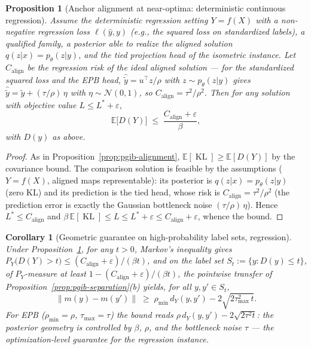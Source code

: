 \documentclass{article}
\theoremstyle{plain}
\newtheorem{proposition}{Proposition}[section]
\newtheorem{corollary}{Corollary}[section]
\theoremstyle{remark}
\newcommand{\E}{\mathbb{E}}
\DeclareMathOperator{\KL}{KL}
\begin{document}
\begin{proposition}[Anchor alignment at near-optima: deterministic continuous regression]
\label{prop:pgib-alignment-regression}
Assume the deterministic regression setting $Y = f(X)$ with a non-negative regression
loss $\ell(\hat y, y)$ (e.g., the squared loss on standardized labels), a qualified
family, a posterior able to realize the aligned solution $q(z|x) = p_\theta(z|y)$,
and the tied projection head of the isometric instance. Let $C_{\mathrm{align}}$ be
the regression risk of the ideal aligned solution --- for the standardized squared
loss and the EPB head, $\hat{\tilde y} = u^{\top} z/\rho$ with
$z \sim p_\theta(z|y)$ gives
$\hat{\tilde y} = \tilde y + (\tau/\rho)\,\eta$ with $\eta \sim \mathcal{N}(0,1)$,
so $C_{\mathrm{align}} = \tau^2/\rho^2$. Then for any solution with objective value
$L \le L^* + \varepsilon$,
\begin{equation}
\E\bigl[ D(Y) \bigr] \;\le\; \frac{C_{\mathrm{align}} + \varepsilon}{\beta} ,
\end{equation}
with $D(y)$ as above.
\end{proposition}

\begin{proof}
As in Proposition~\ref{prop:pgib-alignment},
$\E[\KL] \ge \E[D(Y)]$ by the covariance bound. The comparison solution is feasible
by the assumptions ($Y = f(X)$, aligned maps representable): its posterior is
$q(z|x) = p_\theta(z|y)$ (zero KL) and its prediction is the tied head, whose risk is
$C_{\mathrm{align}} = \tau^2/\rho^2$ (the prediction error is exactly the Gaussian
bottleneck noise $(\tau/\rho)\,\eta$). Hence $L^* \le C_{\mathrm{align}}$ and
$\beta\,\E[\KL] \le L \le L^* + \varepsilon \le C_{\mathrm{align}} + \varepsilon$,
whence the bound.
\end{proof}

\begin{corollary}[Geometric guarantee on high-probability label sets, regression]
\label{cor:pgib-alignment-regression}
Under Proposition~\ref{prop:pgib-alignment-regression}, for any $t > 0$, Markov's
inequality gives
$P_Y\bigl(D(Y) > t\bigr) \le (C_{\mathrm{align}} + \varepsilon)/(\beta t)$, and on the
label set $S_t := \{ y : D(y) \le t \}$, of $P_Y$-measure at least
$1 - (C_{\mathrm{align}} + \varepsilon)/(\beta t)$, the pointwise transfer of
Proposition~\ref{prop:pgib-separation}(b) yields, for all $y, y' \in S_t$,
\begin{equation}
\|m(y) - m(y')\| \;\ge\; \rho_{\min}\, d_Y(y, y')
- 2\sqrt{2\tau^2_{\max}\, t} .
\end{equation}
For EPB ($\rho_{\min} = \rho$, $\tau_{\max} = \tau$) the bound reads
$\rho\, d_Y(y, y') - 2\sqrt{2\tau^2 t}$: the posterior geometry is controlled by
$\beta$, $\rho$, and the bottleneck noise $\tau$ --- the optimization-level guarantee
for the regression instance.
\end{corollary}
\end{document}

